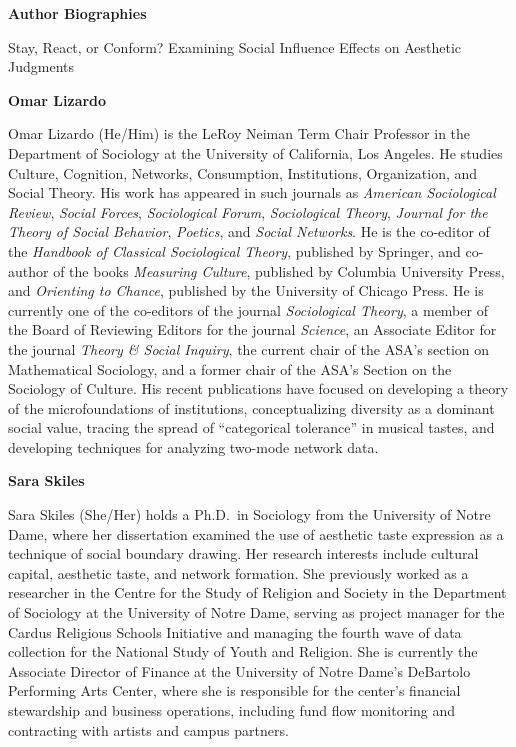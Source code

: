 \documentclass[12pt, letterpaper]{article}
\begin{document}
\begin{center}
{\LARGE \textbf{Author Biographies}}

\vspace{0.5em}

{\large Stay, React, or Conform? Examining Social Influence Effects on Aesthetic Judgments}
\end{center}

\vspace{2em}

\noindent\textbf{Omar Lizardo}

\vspace{0.5em}

\noindent Omar Lizardo (He/Him) is the LeRoy Neiman Term Chair Professor in the
Department of Sociology at the University of California, Los Angeles. He studies
Culture, Cognition, Networks, Consumption, Institutions, Organization, and Social
Theory. His work has appeared in such journals as \textit{American Sociological
Review}, \textit{Social Forces}, \textit{Sociological Forum}, \textit{Sociological
Theory}, \textit{Journal for the Theory of Social Behavior}, \textit{Poetics}, and
\textit{Social Networks}. He is the co-editor of the \textit{Handbook of Classical
Sociological Theory}, published by Springer, and co-author of the books
\textit{Measuring Culture}, published by Columbia University Press, and
\textit{Orienting to Chance}, published by the University of Chicago Press. He is
currently one of the co-editors of the journal \textit{Sociological Theory}, a
member of the Board of Reviewing Editors for the journal \textit{Science}, an
Associate Editor for the journal \textit{Theory \& Social Inquiry}, the current
chair of the ASA's section on Mathematical Sociology, and a former chair of the
ASA's Section on the Sociology of Culture. His recent publications have focused on
developing a theory of the microfoundations of institutions, conceptualizing
diversity as a dominant social value, tracing the spread of ``categorical
tolerance'' in musical tastes, and developing techniques for analyzing two-mode
network data.

\vspace{2em}

\noindent\textbf{Sara Skiles}

\vspace{0.5em}

\noindent Sara Skiles (She/Her) holds a Ph.D.\ in Sociology from the University of
Notre Dame, where her dissertation examined the use of aesthetic taste expression
as a technique of social boundary drawing. Her research interests include cultural
capital, aesthetic taste, and network formation. She previously worked as a
researcher in the Centre for the Study of Religion and Society in the Department
of Sociology at the University of Notre Dame, serving as project manager for the
Cardus Religious Schools Initiative and managing the fourth wave of data
collection for the National Study of Youth and Religion. She is currently the
Associate Director of Finance at the University of Notre Dame's DeBartolo
Performing Arts Center, where she is responsible for the center's financial
stewardship and business operations, including fund flow monitoring and
contracting with artists and campus partners.
\end{document}
